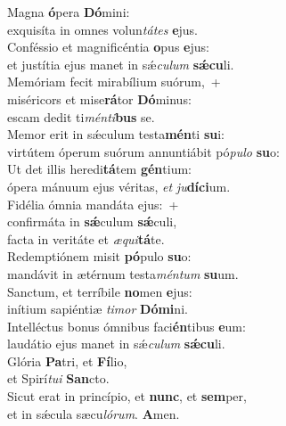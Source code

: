 \evenverse Magna \textbf{ó}pera \textbf{Dó}mini:~\*\\
\evenverse exquisíta in omnes volun\textit{tá}\textit{tes} \textbf{e}jus.\\
\oddverse Conféssio et magnificéntia \textbf{o}pus \textbf{e}jus:~\*\\
\oddverse et justítia ejus manet in sǽ\textit{cu}\textit{lum} \textbf{sǽ}\textbf{cu}li.\\
\evenverse Memóriam fecit mirabílium suórum,~+\\
\evenverse  miséricors et mise\textbf{rá}tor \textbf{Dó}minus:~\*\\
\evenverse escam dedit ti\textit{mén}\textit{ti}\textbf{bus} se.\\
\oddverse Memor erit in sǽculum testa\textbf{mén}ti \textbf{su}i:~\*\\
\oddverse virtútem óperum suórum annuntiábit pó\textit{pu}\textit{lo} \textbf{su}o:\\
\evenverse Ut det illis heredi\textbf{tá}tem \textbf{gén}tium:~\*\\
\evenverse ópera mánuum ejus véritas, \textit{et} \textit{ju}\textbf{dí}\textbf{ci}um.\\
\oddverse Fidélia ómnia mandáta ejus:~+\\
\oddverse  confirmáta in \textbf{sǽ}culum \textbf{sǽ}culi,~\*\\
\oddverse facta in veritáte et \textit{æ}\textit{qui}\textbf{tá}te.\\
\evenverse Redemptiónem misit \textbf{pó}pulo \textbf{su}o:~\*\\
\evenverse mandávit in ætérnum testa\textit{mén}\textit{tum} \textbf{su}um.\\
\oddverse Sanctum, et terríbile \textbf{no}men \textbf{e}jus:~\*\\
\oddverse inítium sapiéntiæ \textit{ti}\textit{mor} \textbf{Dó}\textbf{mi}ni.\\
\evenverse Intelléctus bonus ómnibus faci\textbf{én}tibus \textbf{e}um:~\*\\
\evenverse laudátio ejus manet in sǽ\textit{cu}\textit{lum} \textbf{sǽ}\textbf{cu}li.\\
\oddverse Glória \textbf{Pa}tri, et \textbf{Fí}lio,~\*\\
\oddverse et Spirí\textit{tu}\textit{i} \textbf{San}cto.\\
\evenverse Sicut erat in princípio, et \textbf{nunc}, et \textbf{sem}per,~\*\\
\evenverse et in sǽcula sæcu\textit{ló}\textit{rum}. \textbf{A}men.\\
